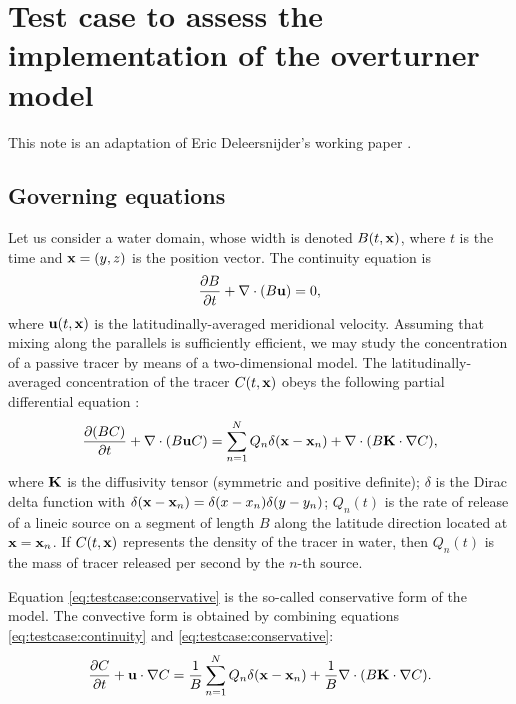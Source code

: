 \section*{Test case to assess the implementation of the overturner model}
This note is an adaptation of Eric Deleersnijder's working paper \cite{deleersnijder2011test}.

\subsection*{Governing equations}
Let us consider a water domain, whose width is denoted $B(t,\mathbf{x})$, where $t$ is the time and $\mathbf{x} = (y,z)$ is the position vector. The continuity equation is
\begin{equation} \label{eq:testcase:continuity}
	\frac{\partial B}{\partial t} + \nabla \cdot (B\mathbf{u}) = 0,
\end{equation}
where $\mathbf{u}(t,\mathbf{x})$ is the latitudinally-averaged meridional velocity. Assuming that mixing along the parallels is sufficiently efficient, we may study the concentration of a passive tracer by means of a two-dimensional model. The latitudinally-averaged concentration of the tracer $C(t,\mathbf{x})$ obeys the following partial differential equation :
\begin{equation} \label{eq:testcase:conservative}
	\frac{\partial (BC)}{\partial t} + \nabla \cdot (B \mathbf{u} C) = \sum_{n=1}^N Q_n \delta(\mathbf{x} - \mathbf{x}_n) + \nabla \cdot (B\mathbf{K} \cdot \nabla C), 
\end{equation}
where $\mathbf{K}$ is the diffusivity tensor (symmetric and positive definite); $\delta$ is the Dirac delta function with $\delta(\mathbf{x}-\mathbf{x}_n) = \delta(x-x_n)\delta(y-y_n)$; $Q_n(t)$ is the rate of release of a lineic source on a segment of length $B$ along the latitude direction located at $\mathbf{x} = \mathbf{x}_n$. If $C(t,\mathbf x)$ represents the 
density of the tracer in water, then $Q_n(t)$ is the mass of tracer released per second by the $n$-th source.

Equation \eqref{eq:testcase:conservative} is the so-called conservative form of the model. The convective form is obtained by combining equations \eqref{eq:testcase:continuity} and \eqref{eq:testcase:conservative}:
\begin{equation}  \label{eq:testcase:convective}
	\frac{\partial C}{\partial t} + \mathbf{u} \cdot \nabla C = \frac{1}{B}\sum_{n=1}^N Q_n \delta(\mathbf{x} - \mathbf{x}_n) + \frac{1}{B} \nabla \cdot (B\mathbf{K} \cdot \nabla C).
\end{equation}

